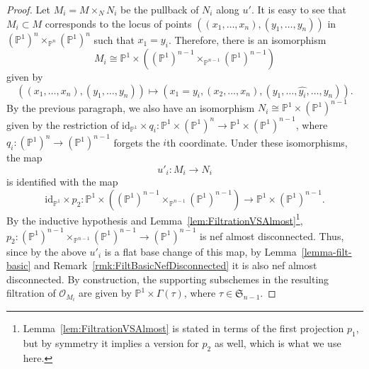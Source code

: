\documentclass[11pt, reqno]{amsart}
\numberwithin{equation}{section}
\theoremstyle{plain}
\theoremstyle{remark}
\theoremstyle{definition}
\theoremstyle{italicsname}
\newcommand{\id}{\mathrm{id}}
\newcommand{\cO}{\mathcal{O}}
\newcommand{\fS}{\mathfrak{S}}
\def\PP{\ensuremath{\mathbb{P}}}
\begin{document}
\begin{proof}
Let $M_i = M \times_{N} N_i$ be the pullback of $N_i$ along $u'$. 
It is easy to see that $M_i \subset M$ corresponds to the locus of points $((x_1, \dots, x_n), (y_1, \dots, y_n))$ in $(\PP^1)^n \times_{\PP^n} (\PP^1)^n$ such that $x_1 = y_i$. 
Therefore, there is an isomorphism 
\begin{equation*}
M_i \cong \PP^1 \times ((\PP^1)^{n-1} \times_{\PP^{n-1}} (\PP^1)^{n-1})
\end{equation*} 
given by 
\begin{equation*}
((x_1, \dots, x_n), (y_1, \dots, y_n)) \mapsto (x_1 = y_i, (x_2, \dots, x_n), (y_1, \dots, \widehat{y_i}, \dots, y_n)). 
\end{equation*} 
By the previous paragraph, we also have an isomorphism $N_i \cong \PP^1 \times (\PP^1)^{n-1}$ given by the restriction of $\id_{\PP^1} \times q_i \colon \PP^1 \times (\PP^1)^n \to \PP^1 \times (\PP^1)^{n-1}$, where $q_i \colon (\PP^1)^n \to (\PP^1)^{n-1}$ forgets the $i$th coordinate. 
Under these isomorphisms, the map 
\begin{equation*}
    u'_i \colon M_i \to N_i 
\end{equation*}
is identified with the map 
\begin{equation*}
    \id_{\PP^1} \times p_2 \colon \PP^1 \times  ((\PP^1)^{n-1} \times_{\PP^{n-1}} (\PP^1)^{n-1}) \to \PP^1 \times (\PP^1)^{n-1}. 
\end{equation*}
By the inductive hypothesis and Lemma~\ref{lem:FiltrationVSAlmost}\footnote{Lemma~\ref{lem:FiltrationVSAlmost} is stated in terms of the first projection $p_1$, but by symmetry it implies a version for $p_2$ as well, which is what we use here.}, 
$p_2 \colon (\PP^1)^{n-1} \times_{\PP^{n-1}} (\PP^1)^{n-1} \to (\PP^1)^{n-1}$ is nef almost disconnected. 
Thus, since by the above $u'_i$ is a flat base change of this map, by Lemma~\ref{lemma-filt-basic} and Remark~\ref{rmk:FiltBasicNefDisconnected} it is also nef almost disconnected. By construction, the supporting subschemes in the resulting filtration of $\cO_{M_i}$ are given by $\PP^1 \times \Gamma(\tau)$, where $\tau \in \fS_{n-1}$. 


\end{proof}
\end{document}
